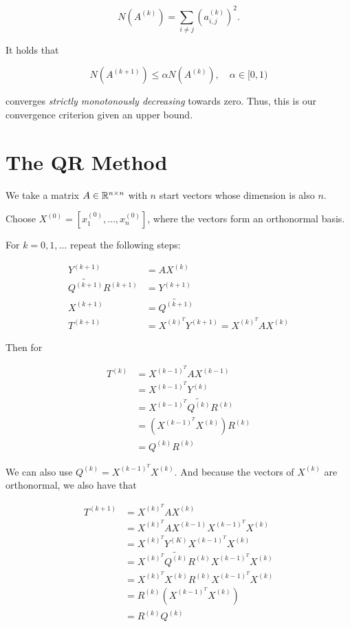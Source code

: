 \[
    N(A^{(k)}) = \sum_{i \ne j} \left(a_{i,j}^{(k)}\right)^2.
\]

It holds that 

\[
    N(A^{(k + 1)}) \le \alpha N(A^{(k)}), \quad \alpha \in [0, 1)
\]

converges \emph{strictly monotonously decreasing} towards zero. Thus, this is our convergence criterion 
given an upper bound.

\section{The QR Method}

We take a matrix \(A \in \mathbb{R}^{n \times n}\) with \(n\) start vectors whose dimension is also \(n\).

Choose \(X^{(0)} = [x_1^{(0)},\dots, x_n^{(0)}]\), where the vectors form an orthonormal basis.

For \(k = 0, 1, \dots\) repeat the following steps:

\begin{align*}
    Y^{(k + 1)} &= AX^{(k)} \\ 
    \tilde{Q^{(k + 1)}} R^{(k + 1)} &= Y^{(k + 1)} \\ 
    X^{(k + 1)} &= \tilde{Q^{(k + 1)}} \\
    T^{(k + 1)} &= X^{(k)^T} Y^{(k + 1)} = X^{(k)^T} A X^{(k)}
\end{align*}

Then for 

\begin{align*} 
    T^{(k)} &= X^{(k - 1)^T} A X^{(k - 1)} \\ 
    &= X^{(k - 1)^T} Y^{(k)} \\ 
    &= X^{(k - 1)^T} \tilde{Q^{(k)}} R^{(k)}\\ 
    &= (X^{(k - 1)^T} X^{(k)}) R^{(k)} \\ 
    &= Q^{(k)} R^{(k)}
\end{align*}

We can also use \(Q^{(k)} = X^{(k - 1)^T} X^{(k)}\). And because the vectors of \(X^{(k)}\) are orthonormal, we also have that 

\begin{align*} 
    T^{(k + 1)} &= X^{(k)^T} A X^{(k)}\\
    &=  X^{(k)^T} A X^{(k - 1)} X^{(k - 1)^T} X^{(k)}\\
    &=  X^{(k)^T} Y^{(K)} X^{(k - 1)^T} X^{(k)}\\
    &=  X^{(k)^T} \tilde{Q^{(k)}} R^{(k)} X^{(k - 1)^T} X^{(k)}\\
    &=  X^{(k)^T} X^{(k)} R^{(k)} X^{(k - 1)^T} X^{(k)}\\
    &=  R^{(k)} (X^{(k - 1)^T} X^{(k)})\\
    &=  R^{(k)} Q^{(k)} 
\end{align*}

